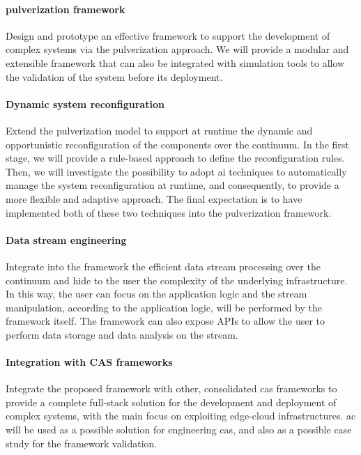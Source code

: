 \documentclass[12pt,a4paper]{article}
\begin{document}
\paragraph{pulverization framework}
Design and prototype an effective framework to support the development of complex systems
via the pulverization approach.
%
We will provide a modular and extensible framework that can also be integrated with simulation tools
to allow the validation of the system before its deployment.

\paragraph{Dynamic system reconfiguration}
Extend the pulverization model to support at runtime the dynamic and opportunistic reconfiguration of the components over the continuum.
%
In the first stage,
we will provide a rule-based approach to define the reconfiguration rules.
%
Then,
we will investigate the possibility to adopt \ac{ai} techniques to automatically manage the system reconfiguration at runtime,
and consequently,
to provide a more flexible and adaptive approach.
%
The final expectation is to have implemented both of these two techniques into the pulverization framework.

\paragraph{Data stream engineering}

Integrate into the framework the efficient data stream processing over the continuum and hide to the user the complexity of the underlying infrastructure.
%
In this way,
the user can focus on the application logic and the stream manipulation,
according to the application logic,
will be performed by the framework itself.
%
The framework can also expose APIs to allow the user to perform data storage and data analysis on the stream.


\paragraph{Integration with CAS frameworks}
Integrate the proposed framework with other, consolidated \ac{cas} frameworks
to provide a complete full-stack solution for the development and deployment of complex systems,
with the main focus on exploiting edge-cloud infrastructures.
%
\ac{ac} will be used as a possible solution for engineering \ac{cas},
and also as a possible case study for the framework validation.
\end{document}

